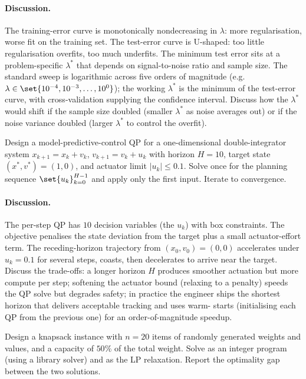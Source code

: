 \paragraph{Discussion.}
The training-error curve is monotonically nondecreasing in
$\lambda$: more regularisation, worse fit on the training set. The
test-error curve is U-shaped: too little regularisation overfits,
too much underfits. The minimum test error sits at a
problem-specific $\lambda^{*}$ that depends on signal-to-noise
ratio and sample size. The standard sweep is logarithmic across
five orders of magnitude (e.g.\ $\lambda \in \set{10^{-4}, 10^{-3},
\ldots, 10^{0}}$); the working $\lambda^{*}$ is the minimum of the
test-error curve, with cross-validation supplying the confidence
interval. Discuss how the $\lambda^{*}$ would shift if the sample
size doubled (smaller $\lambda^{*}$ as noise averages out) or if
the noise variance doubled (larger $\lambda^{*}$ to control the
overfit).

\begin{exercise}
Design a model-predictive-control QP for a one-dimensional
double-integrator system $x_{k+1} = x_{k} + v_{k}$, $v_{k+1} =
v_{k} + u_{k}$ with horizon $H = 10$, target state
$(x^{*}, v^{*}) = (1, 0)$, and actuator limit $|u_{k}| \leq 0.1$.
Solve once for the planning sequence $\set{u_{k}}_{k=0}^{H-1}$
and apply only the first input. Iterate to convergence.
\end{exercise}

\paragraph{Discussion.}
The per-step QP has $10$ decision variables (the $u_{k}$) with box
constraints. The objective penalises the state deviation from the
target plus a small actuator-effort term. The receding-horizon
trajectory from $(x_{0}, v_{0}) = (0, 0)$ accelerates under
$u_{k} = 0.1$ for several steps, coasts, then decelerates to
arrive near the target. Discuss the trade-offs: a longer horizon
$H$ produces smoother actuation but more compute per step;
softening the actuator bound (relaxing to a penalty) speeds the
QP solve but degrades safety; in practice the engineer ships the
shortest horizon that delivers acceptable tracking and uses warm-
starts (initialising each QP from the previous one) for an
order-of-magnitude speedup.

\begin{exercise}
Design a knapsack instance with $n = 20$ items of randomly
generated weights and values, and a capacity of $50\%$ of the
total weight. Solve as an integer program (using a library
solver) and as the LP relaxation. Report the optimality gap
between the two solutions.
\end{exercise}

